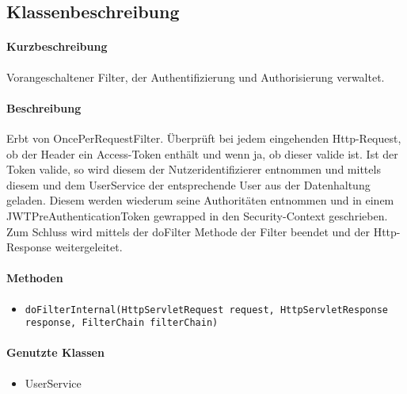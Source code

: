 \subsection*{Klassenbeschreibung}%
\paragraph*{Kurzbeschreibung}
Vorangeschaltener Filter, der Authentifizierung und Authorisierung verwaltet.
\paragraph*{Beschreibung}
Erbt von \dq OncePerRequestFilter\dq. Überprüft bei jedem eingehenden Http-Request, ob der Header ein Access-Token enthält und wenn ja, ob dieser valide ist. 
Ist der Token valide, so wird diesem der Nutzeridentifizierer entnommen und mittels diesem und dem UserService der entsprechende
User aus der Datenhaltung geladen. Diesem werden wiederum seine Authoritäten entnommen und in einem JWTPreAuthenticationToken gewrapped
in den Security-Context geschrieben. Zum Schluss wird mittels der \dq doFilter\dq{} Methode der Filter beendet und der Http-Response weitergeleitet.
\paragraph*{Methoden}
\begin{itemize}
	\item \texttt{doFilterInternal(HttpServletRequest request, HttpServletResponse response, FilterChain filterChain)}
\end{itemize}	
\paragraph*{Genutzte Klassen}
\begin{itemize}
	\item UserService
\end{itemize}

